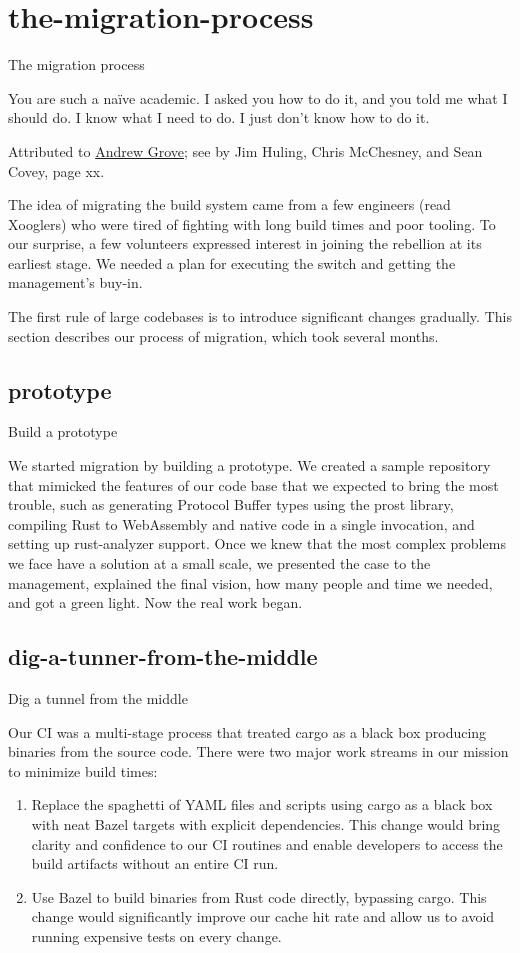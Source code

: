 \documentclass{article}
\begin{document}
\section{the-migration-process}{The migration process}
\epigraph{
    You are such a naïve academic. I asked you how to do it, and you told me what I should do. I know what I need to do. I just don't know how to do it.
}{Attributed to \href{https://en.wikipedia.org/wiki/Andrew_Grove}{Andrew Grove}; see \href{https://www.amazon.com/Disciplines-Execution-Achieving-Wildly-Important/dp/1491517751}{\cite{The 4 Disciplines of Execution}} by Jim Huling, Chris McChesney, and Sean Covey, page xx.}

The idea of migrating the build system came from a few engineers (read Xooglers) who were tired of fighting with long build times and poor tooling.
To our surprise, a few volunteers expressed interest in joining the rebellion at its earliest stage.
We needed a plan for executing the switch and getting the management's buy-in.

The first rule of large codebases is to introduce significant changes gradually. This section describes our process of migration, which took several months.

\subsection{prototype}{Build a prototype}

We started migration by building a prototype.
We created a sample repository that mimicked the features of our code base that we expected to bring the most trouble, such as generating Protocol Buffer types using the prost library, compiling Rust to WebAssembly and native code in a single invocation, and setting up rust-analyzer support.
Once we knew that the most complex problems we face have a solution at a small scale, we presented the case to the management, explained the final vision, how many people and time we needed, and got a green light.
Now the real work began.

\subsection{dig-a-tunner-from-the-middle}{Dig a tunnel from the middle}

Our CI was a multi-stage process that treated cargo as a black box producing binaries from the source code.
There were two major work streams in our mission to minimize build times:
\begin{enumerate}
  \item 
    Replace the spaghetti of YAML files and scripts using cargo as a black box with neat Bazel targets with explicit dependencies.
    This change would bring clarity and confidence to our CI routines and enable developers to access the build artifacts without an entire CI run.
  \item 
    Use Bazel to build binaries from Rust code directly, bypassing cargo.
    This change would significantly improve our cache hit rate and allow us to avoid running expensive tests on every change.
\end{enumerate}
\end{document}
